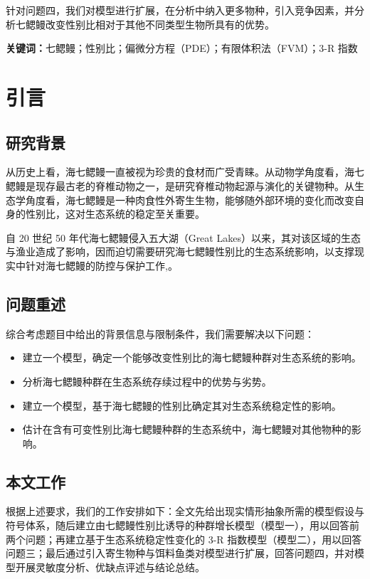 \documentclass[11pt,a4paper]{ctexart}
\begin{document}
针对问题四，我们对模型进行扩展，在分析中纳入更多物种，引入竞争因素，并分析七鳃鳗改变性别比相对于其他不同类型生物所具有的优势。

\vspace{6pt}
\noindent\textbf{关键词：}七鳃鳗；性别比；偏微分方程（PDE）；有限体积法（FVM）；3-R 指数

\newpage
\pagestyle{fancy}

\section{引言}

\subsection{研究背景}

从历史上看，海七鳃鳗一直被视为珍贵的食材而广受青睐。从动物学角度看，海七鳃鳗是现存最古老的脊椎动物之一，是研究脊椎动物起源与演化的关键物种。从生态学角度看，海七鳃鳗是一种肉食性外寄生生物，能够随外部环境的变化而改变自身的性别比，这对生态系统的稳定至关重要。

自 20 世纪 50 年代海七鳃鳗侵入五大湖（Great Lakes）以来，其对该区域的生态与渔业造成了影响，因而迫切需要研究海七鳃鳗性别比的生态系统影响，以支撑现实中针对海七鳃鳗的防控与保护工作\cite{1},\cite{2}。

\subsection{问题重述}

综合考虑题目中给出的背景信息与限制条件，我们需要解决以下问题：

\begin{itemize}
\item 建立一个模型，确定一个能够改变性别比的海七鳃鳗种群对生态系统的影响。
\item 分析海七鳃鳗种群在生态系统存续过程中的优势与劣势。
\item 建立一个模型，基于海七鳃鳗的性别比确定其对生态系统稳定性的影响。
\item 估计在含有可变性别比海七鳃鳗种群的生态系统中，海七鳃鳗对其他物种的影响。
\end{itemize}

\subsection{本文工作}

根据上述要求，我们的工作安排如下：全文先给出现实情形抽象所需的模型假设与符号体系，随后建立由七鳃鳗性别比诱导的种群增长模型（模型一），用以回答前两个问题；再建立基于生态系统稳定性变化的 3-R 指数模型（模型二），用以回答问题三；最后通过引入寄生物种与饵料鱼类对模型进行扩展，回答问题四，并对模型开展灵敏度分析、优缺点评述与结论总结。
\end{document}
